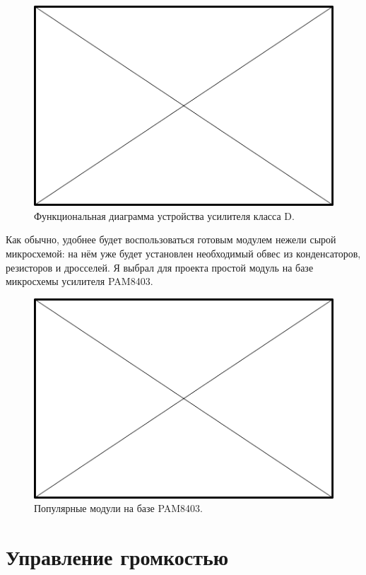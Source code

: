 \begin{figure}
  \centering
  \includegraphics{TODO.png}
  \caption{Функциональная диаграмма устройства усилителя класса D.}
  \label{fig:sound-amp-class-d-diagram}
\end{figure}

Как обычно, удобнее будет воспользоваться готовым модулем нежели сырой микросхемой: на нём уже будет установлен необходимый обвес из конденсаторов, резисторов и дросселей. Я выбрал для проекта простой модуль на базе микросхемы усилителя PAM8403.

\begin{figure}
  \centering
  \includegraphics{TODO.png}
  \caption{Популярные модули на базе PAM8403.}
  \label{fig:pam8403-modules}
\end{figure}

\section{Управление громкостью}


